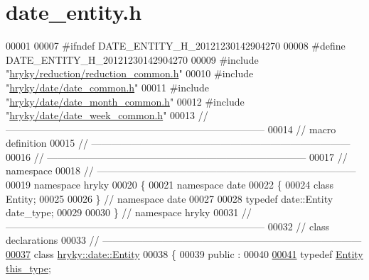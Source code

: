 \hypertarget{date__entity_8h_source}{\section{date\-\_\-entity.\-h}
}

\begin{DoxyCode}
00001 
00007 \textcolor{preprocessor}{#ifndef DATE\_ENTITY\_H\_20121230142904270}
00008 \textcolor{preprocessor}{}\textcolor{preprocessor}{#define DATE\_ENTITY\_H\_20121230142904270}
00009 \textcolor{preprocessor}{}\textcolor{preprocessor}{#include "\hyperlink{reduction__common_8h}{hryky/reduction/reduction_common.h}"}
00010 \textcolor{preprocessor}{#include "\hyperlink{date__common_8h}{hryky/date/date_common.h}"}
00011 \textcolor{preprocessor}{#include "\hyperlink{date__month__common_8h}{hryky/date/date_month_common.h}"}
00012 \textcolor{preprocessor}{#include "\hyperlink{date__week__common_8h}{hryky/date/date_week_common.h}"}
00013 \textcolor{comment}{//
      ------------------------------------------------------------------------------}
00014 \textcolor{comment}{// macro definition}
00015 \textcolor{comment}{//
      ------------------------------------------------------------------------------}
00016 \textcolor{comment}{//
      ------------------------------------------------------------------------------}
00017 \textcolor{comment}{// namespace}
00018 \textcolor{comment}{//
      ------------------------------------------------------------------------------}
00019 \textcolor{keyword}{namespace }hryky
00020 \{
00021 \textcolor{keyword}{namespace }date
00022 \{
00024     \textcolor{keyword}{class }Entity;
00025 
00026 \} \textcolor{comment}{// namespace date}
00027 
00028 \textcolor{keyword}{typedef} date::Entity date\_type;
00029 
00030 \} \textcolor{comment}{// namespace hryky}
00031 \textcolor{comment}{//
      ------------------------------------------------------------------------------}
00032 \textcolor{comment}{// class declarations}
00033 \textcolor{comment}{//
      ------------------------------------------------------------------------------}
\hypertarget{date__entity_8h_source_l00037}{}\hyperlink{classhryky_1_1date_1_1_entity}{00037} \textcolor{comment}{}\textcolor{keyword}{class }\hyperlink{classhryky_1_1date_1_1_entity}{hryky::date::Entity}
00038 \{
00039 \textcolor{keyword}{public} :
00040 
\hypertarget{date__entity_8h_source_l00041}{}\hyperlink{classhryky_1_1date_1_1_entity_aa89e431c521eed48992301fe010a9eaa}{00041}     \textcolor{keyword}{typedef} \hyperlink{classhryky_1_1date_1_1_entity}{Entity} \hyperlink{classhryky_1_1date_1_1_entity_aa89e431c521eed48992301fe010a9eaa}{this_type};

\end{DoxyCode}
